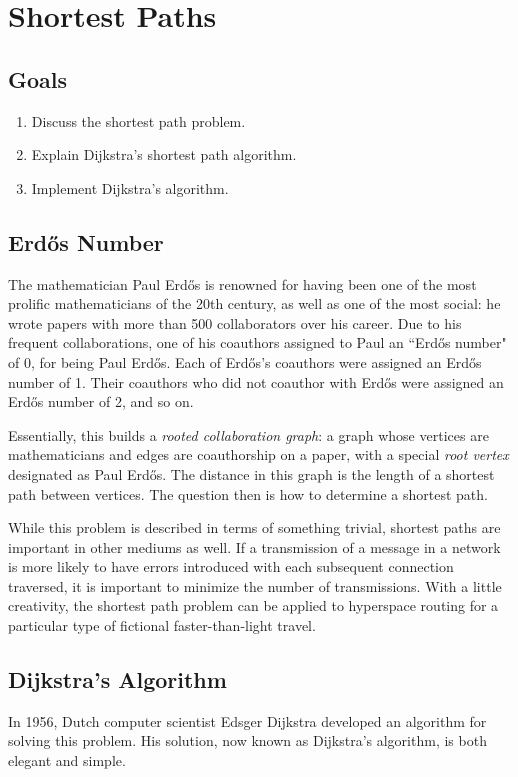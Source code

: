 \documentclass[m3380-lec-main.tex]{subfiles}
\begin{document}
\chapter{Shortest Paths}

\section*{Goals}
\begin{enumerate}[1.~]\setlength{\itemsep}{0pt}
\item Discuss the shortest path problem.
\item Explain Dijkstra's shortest path algorithm.
\item Implement Dijkstra's algorithm.
\end{enumerate}

\newcommand{\Erd}{\textrm{Erd\H{o}s}}

\section{\Erd{} Number} The mathematician Paul \Erd{} is renowned for having been one of the most prolific mathematicians of the 20th century, as well as one of the most social: he wrote papers with more than 500 collaborators over his career. Due to his frequent collaborations, one of his coauthors assigned to Paul an ``\Erd{} number" of 0, for being Paul \Erd. Each of \Erd's coauthors were assigned an \Erd{} number of 1. Their coauthors who did not coauthor with \Erd{} were assigned an \Erd{} number of 2, and so on.

Essentially, this builds a \emph{rooted collaboration graph}: a graph whose vertices are mathematicians and edges are coauthorship on a paper, with a special \emph{root vertex} designated as Paul \Erd. The distance in this graph is the length of a shortest path between vertices. The question then is how to determine a shortest path.

While this problem is described in terms of something trivial, shortest paths are important in other mediums as well. If a transmission of a message in a network is more likely to have errors introduced with each subsequent connection traversed, it is important to minimize the number of transmissions. With a little creativity, the shortest path problem can be applied to hyperspace routing for a particular type of fictional faster-than-light travel.

\section{Dijkstra's Algorithm}
In 1956, Dutch computer scientist {Edsger Dijkstra} developed an algorithm for solving this problem. His solution, now known as Dijkstra's algorithm, is both elegant and simple.
\end{document}
